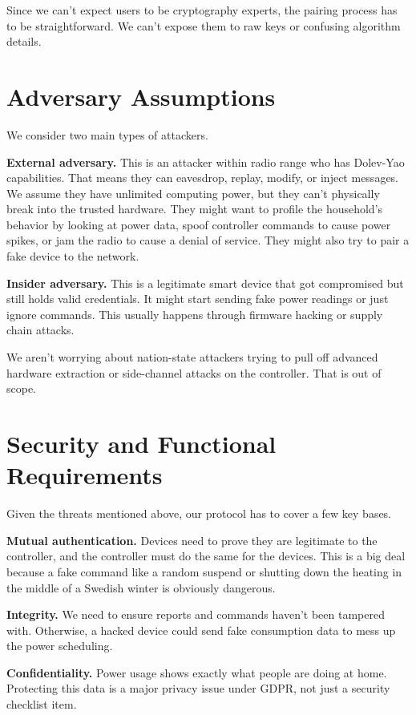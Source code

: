 \documentclass[a4paper,11pt]{article}
\begin{document}
Since we can't expect users to be cryptography experts, the pairing process has to be straightforward. We can't expose them to raw keys or confusing algorithm details.

\section{Adversary Assumptions}

We consider two main types of attackers.

\textbf{External adversary.} This is an attacker within radio range who has Dolev-Yao capabilities. That means they can eavesdrop, replay, modify, or inject messages. We assume they have unlimited computing power, but they can't physically break into the trusted hardware. They might want to profile the household's behavior by looking at power data, spoof controller commands to cause power spikes, or jam the radio to cause a denial of service. They might also try to pair a fake device to the network.

\textbf{Insider adversary.} This is a legitimate smart device that got compromised but still holds valid credentials. It might start sending fake power readings or just ignore commands. This usually happens through firmware hacking or supply chain attacks.

We aren't worrying about nation-state attackers trying to pull off advanced hardware extraction or side-channel attacks on the controller. That is out of scope.

\section{Security and Functional Requirements}

Given the threats mentioned above, our protocol has to cover a few key bases.

\textbf{Mutual authentication.} Devices need to prove they are legitimate to the controller, and the controller must do the same for the devices. This is a big deal because a fake command like a random suspend or shutting down the heating in the middle of a Swedish winter is obviously dangerous.

\textbf{Integrity.} We need to ensure reports and commands haven't been tampered with. Otherwise, a hacked device could send fake consumption data to mess up the power scheduling.

\textbf{Confidentiality.} Power usage shows exactly what people are doing at home. Protecting this data is a major privacy issue under GDPR, not just a security checklist item.
\end{document}
